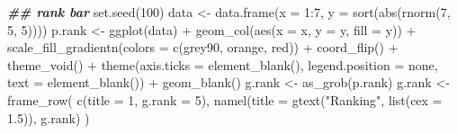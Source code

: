 \documentclass[
]{article}
\newenvironment{Shaded}{\begin{snugshade}}{\end{snugshade}}
\newcommand{\AttributeTok}[1]{\textcolor[rgb]{0.77,0.63,0.00}{#1}}
\newcommand{\DecValTok}[1]{\textcolor[rgb]{0.00,0.00,0.81}{#1}}
\newcommand{\DocumentationTok}[1]{\textcolor[rgb]{0.56,0.35,0.01}{\textbf{\textit{#1}}}}
\newcommand{\FloatTok}[1]{\textcolor[rgb]{0.00,0.00,0.81}{#1}}
\newcommand{\FunctionTok}[1]{\textcolor[rgb]{0.00,0.00,0.00}{#1}}
\newcommand{\NormalTok}[1]{#1}
\newcommand{\OtherTok}[1]{\textcolor[rgb]{0.56,0.35,0.01}{#1}}
\newcommand{\SpecialCharTok}[1]{\textcolor[rgb]{0.00,0.00,0.00}{#1}}
\newcommand{\StringTok}[1]{\textcolor[rgb]{0.31,0.60,0.02}{#1}}
\begin{document}
\begin{Shaded}
\begin{Highlighting}[]
\DocumentationTok{\#\# rank bar}
\FunctionTok{set.seed}\NormalTok{(}\DecValTok{100}\NormalTok{)}
\NormalTok{data }\OtherTok{\textless{}{-}} \FunctionTok{data.frame}\NormalTok{(}\AttributeTok{x =} \DecValTok{1}\SpecialCharTok{:}\DecValTok{7}\NormalTok{, }\AttributeTok{y =} \FunctionTok{sort}\NormalTok{(}\FunctionTok{abs}\NormalTok{(}\FunctionTok{rnorm}\NormalTok{(}\DecValTok{7}\NormalTok{, }\DecValTok{5}\NormalTok{, }\DecValTok{5}\NormalTok{))))}
\NormalTok{p.rank }\OtherTok{\textless{}{-}} \FunctionTok{ggplot}\NormalTok{(data) }\SpecialCharTok{+}
  \FunctionTok{geom\_col}\NormalTok{(}\FunctionTok{aes}\NormalTok{(}\AttributeTok{x =}\NormalTok{ x, }\AttributeTok{y =}\NormalTok{ y, }\AttributeTok{fill =}\NormalTok{ y)) }\SpecialCharTok{+}
  \FunctionTok{scale\_fill\_gradientn}\NormalTok{(}\AttributeTok{colors =} \FunctionTok{c}\NormalTok{(}\StringTok{\textquotesingle{}grey90\textquotesingle{}}\NormalTok{, }\StringTok{\textquotesingle{}orange\textquotesingle{}}\NormalTok{, }\StringTok{\textquotesingle{}red\textquotesingle{}}\NormalTok{)) }\SpecialCharTok{+}
  \FunctionTok{coord\_flip}\NormalTok{() }\SpecialCharTok{+}
  \FunctionTok{theme\_void}\NormalTok{() }\SpecialCharTok{+}
  \FunctionTok{theme}\NormalTok{(}\AttributeTok{axis.ticks =} \FunctionTok{element\_blank}\NormalTok{(),}
    \AttributeTok{legend.position =} \StringTok{\textquotesingle{}none\textquotesingle{}}\NormalTok{,}
    \AttributeTok{text =} \FunctionTok{element\_blank}\NormalTok{()) }\SpecialCharTok{+}
  \FunctionTok{geom\_blank}\NormalTok{()}
\NormalTok{g.rank }\OtherTok{\textless{}{-}} \FunctionTok{as\_grob}\NormalTok{(p.rank)}
\NormalTok{g.rank }\OtherTok{\textless{}{-}} \FunctionTok{frame\_row}\NormalTok{(}
  \FunctionTok{c}\NormalTok{(}\AttributeTok{title =} \DecValTok{1}\NormalTok{, }\AttributeTok{g.rank =} \DecValTok{5}\NormalTok{),}
  \FunctionTok{namel}\NormalTok{(}\AttributeTok{title =} \FunctionTok{gtext}\NormalTok{(}\StringTok{"Ranking"}\NormalTok{, }\FunctionTok{list}\NormalTok{(}\AttributeTok{cex =} \FloatTok{1.5}\NormalTok{)), g.rank)}
\NormalTok{)}


\end{Highlighting}
\end{Shaded}
\end{document}
